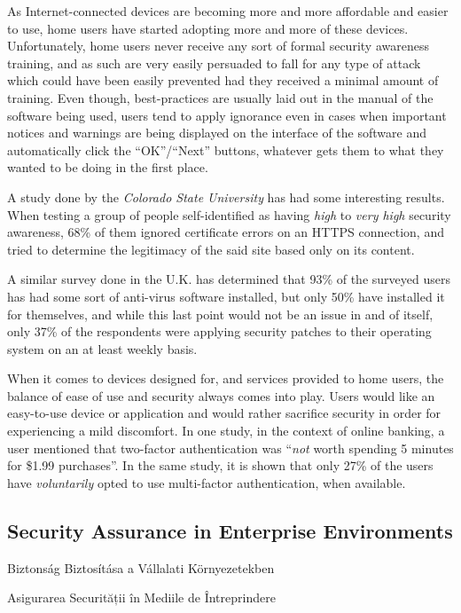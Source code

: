 \documentclass[a4paper,12pt]{article}
\newcommand\subsectionhu[1]{\addcontentsline{toc.hu}{subsection} {\protect\numberline{\thesubsection} #1}}
\newcommand\subsectionro[1]{\addcontentsline{toc.ro}{subsection} {\protect\numberline{\thesubsection} #1}}
\begin{document}
	As Internet-connected devices are becoming more and more affordable and easier to use, home users have started adopting more and more of these devices. Unfortunately, home users never receive any sort of formal security awareness training, and as such are very easily persuaded to fall for any type of attack which could have been easily prevented had they received a minimal amount of training. Even though, best-practices are usually laid out in the manual of the software being used, users tend to apply ignorance\cite{jnielsen12} even in cases when important notices and warnings are being displayed on the interface of the software and automatically click the ``OK''/``Next'' buttons, whatever gets them to what they wanted to be doing in the first place.
	
	A study done by the \textit{Colorado State University} has had some interesting\cite{ahowe12} results. When testing a group of people self-identified as having \textit{high} to \textit{very high} security awareness, 68\% of them ignored certificate errors on an HTTPS connection, and tried to determine the legitimacy of the said site based only on its content.
	
	A similar survey done in the U.K. has determined\cite{sfurnell07} that 93\% of the surveyed users has had some sort of anti-virus software installed, but only 50\% have installed it for themselves, and while this last point would not be an issue in and of itself, only 37\% of the respondents were applying security patches to their operating system on an at least weekly basis.
	
	When it comes to devices designed for, and services provided to home users, the balance of ease of use and security always comes into play. Users would like an easy-to-use device or application and would rather sacrifice security in order for experiencing a mild discomfort. In one study, in the context of online banking, a user mentioned that two-factor authentication was ``\textit{not} worth spending 5 minutes for \$1.99 purchases''\cite{ecrist14}. In the same study, it is shown that only 27\% of the users have \textit{voluntarily} opted to use multi-factor authentication, when available.
	
\subsection{Security Assurance in Enterprise Environments} \label{ssec:secassentenv}
\subsectionhu{Biztonság Biztosítása a Vállalati Környezetekben} \subsectionro{Asigurarea Securității în Mediile de Întreprindere}
\end{document}
